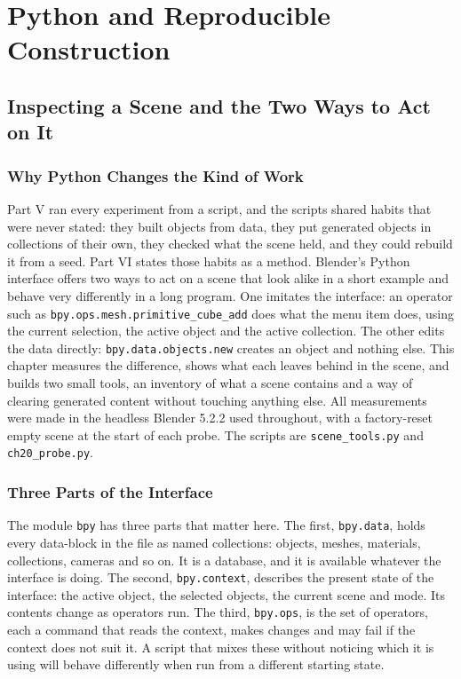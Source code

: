 \part{Python and Reproducible Construction}

\chapter{Inspecting a Scene and the Two Ways to Act on It}

\section{Why Python Changes the Kind of Work}

Part V ran every experiment from a script, and the scripts shared habits that were never stated: they built objects from data, they put generated objects in collections of their own, they checked what the scene held, and they could rebuild it from a seed. Part VI states those habits as a method. Blender's Python interface offers two ways to act on a scene that look alike in a short example and behave very differently in a long program. One imitates the interface: an operator such as \texttt{bpy.ops.mesh.primitive\_cube\_add} does what the menu item does, using the current selection, the active object and the active collection. The other edits the data directly: \texttt{bpy.data.objects.new} creates an object and nothing else. This chapter measures the difference, shows what each leaves behind in the scene, and builds two small tools, an inventory of what a scene contains and a way of clearing generated content without touching anything else. All measurements were made in the headless Blender 5.2.2 used throughout, with a factory-reset empty scene at the start of each probe. The scripts are \texttt{scene\_tools.py} and \texttt{ch20\_probe.py}.

\section{Three Parts of the Interface}

The module \texttt{bpy} has three parts that matter here. The first, \texttt{bpy.data}, holds every data-block in the file as named collections: objects, meshes, materials, collections, cameras and so on. It is a database, and it is available whatever the interface is doing. The second, \texttt{bpy.context}, describes the present state of the interface: the active object, the selected objects, the current scene and mode. Its contents change as operators run. The third, \texttt{bpy.ops}, is the set of operators, each a command that reads the context, makes changes and may fail if the context does not suit it. A script that mixes these without noticing which it is using will behave differently when run from a different starting state.

